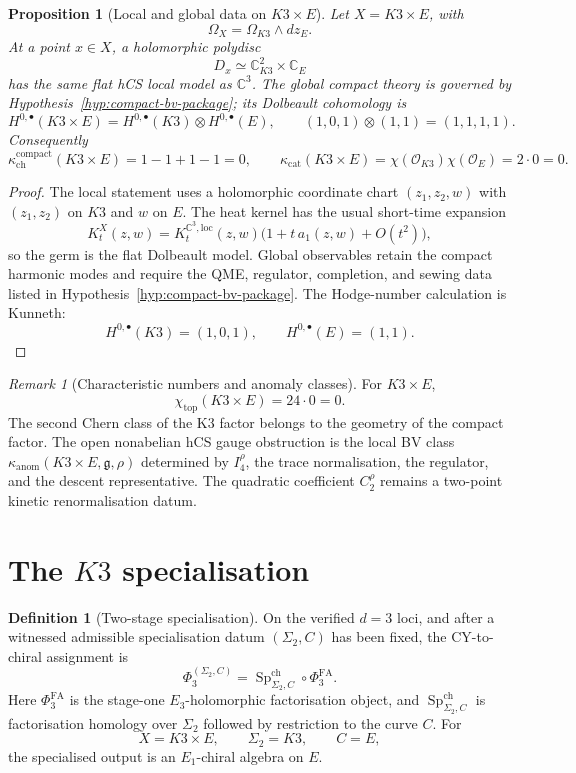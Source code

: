 \documentclass[11pt]{amsart}
\providecommand{\C}{\mathbb{C}}
\providecommand{\gfrak}{\mathfrak{g}}
\providecommand{\cO}{\mathcal{O}}
\providecommand{\PhiFA}{\Phi^{\mathrm{FA}}}
\providecommand{\SpCh}{\operatorname{Sp}^{\mathrm{ch}}}
\providecommand{\Eone}{E_1}
\providecommand{\kanom}{\kappa_{\operatorname{anom}}}
\providecommand{\kchc}{\kappa_{\mathrm{ch}}^{\mathrm{compact}}}
\providecommand{\kcat}{\kappa_{\mathrm{cat}}}
\theoremstyle{plain}
\newtheorem{proposition}[theorem]{Proposition}
\theoremstyle{definition}
\newtheorem{definition}[theorem]{Definition}
\theoremstyle{remark}
\newtheorem{remark}[theorem]{Remark}
\begin{document}
\begin{proposition}[Local and global data on \(K3\times E\)]
\label{prop:k3e-local-global}
Let \(X=K3\times E\), with
\[
  \Omega_X=\Omega_{K3}\wedge dz_E .
\]
At a point \(x\in X\), a holomorphic polydisc
\[
  D_x\simeq \C^2_{K3}\times\C_E
\]
has the same flat hCS local model as \(\C^3\).  The global compact
theory is governed by Hypothesis~\ref{hyp:compact-bv-package}; its
Dolbeault cohomology is
\[
  H^{0,\bullet}(K3\times E)
  =
  H^{0,\bullet}(K3)\otimes H^{0,\bullet}(E),
  \qquad
  (1,0,1)\otimes(1,1)=(1,1,1,1).
\]
Consequently
\[
  \kchc(K3\times E)
  =
  1-1+1-1
  =
  0,
  \qquad
  \kcat(K3\times E)=
  \chi(\cO_{K3})\chi(\cO_E)=2\cdot0=0.
\]
\end{proposition}

\begin{proof}
The local statement uses a holomorphic coordinate chart
\((z_1,z_2,w)\) with \((z_1,z_2)\) on \(K3\) and \(w\) on \(E\).  The
heat kernel has the usual short-time expansion
\[
  K_t^X(z,w)=K_t^{\C^3,\mathrm{loc}}(z,w)\bigl(1+t\,a_1(z,w)+O(t^2)\bigr),
\]
so the germ is the flat Dolbeault model.  Global observables retain the
compact harmonic modes and require the QME, regulator, completion, and
sewing data listed in Hypothesis~\ref{hyp:compact-bv-package}.  The
Hodge-number calculation is Kunneth:
\[
  H^{0,\bullet}(K3)=(1,0,1),\qquad
  H^{0,\bullet}(E)=(1,1).
\]
\end{proof}

\begin{remark}[Characteristic numbers and anomaly classes]
\label{rem:k3e-characteristic-numbers}
For \(K3\times E\),
\[
  \chi_{\mathrm{top}}(K3\times E)=24\cdot0=0.
\]
The second Chern class of the K3 factor belongs to the geometry of the
compact factor.  The open nonabelian hCS gauge obstruction is the local BV class
\(\kanom(K3\times E,\gfrak,\rho)\) determined by \(I_4^\rho\), the
trace normalisation, the regulator, and the descent representative.
The quadratic coefficient \(C_2^\rho\) remains a two-point kinetic
renormalisation datum.
\end{remark}

\section{The \texorpdfstring{$K3$}{K3} specialisation}
\label{sec:k3-specialisation}

\begin{definition}[Two-stage specialisation]
\label{def:two-stage-specialisation}
On the verified \(d=3\) loci, and after a witnessed admissible
specialisation datum \((\Sigma_2,C)\) has been fixed, the CY-to-chiral
assignment is
\[
  \Phi_3^{(\Sigma_2,C)}
  =
  \SpCh_{\Sigma_2,C}\circ\PhiFA_3 .
\]
Here \(\PhiFA_3\) is the stage-one \(E_3\)-holomorphic factorisation
object, and \(\SpCh_{\Sigma_2,C}\) is factorisation homology over
\(\Sigma_2\) followed by restriction to the curve \(C\).  For
\[
  X=K3\times E,\qquad
  \Sigma_2=K3,\qquad
  C=E,
\]
the specialised output is an \(\Eone\)-chiral algebra on \(E\).
\end{definition}
\end{document}
